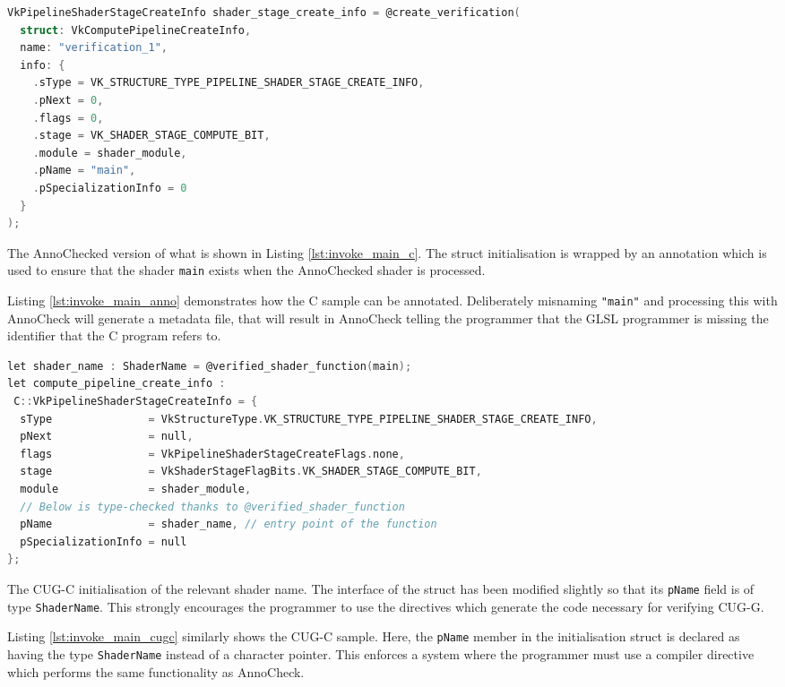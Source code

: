 \documentclass[a4paper,12pt,twoside,openright]{report}
\begin{document}
\begin{lstfloat}
\begin{lstlisting}[language=C]
VkPipelineShaderStageCreateInfo shader_stage_create_info = @create_verification(
  struct: VkComputePipelineCreateInfo,
  name: "verification_1",
  info: {
    .sType = VK_STRUCTURE_TYPE_PIPELINE_SHADER_STAGE_CREATE_INFO,
    .pNext = 0,
    .flags = 0,
    .stage = VK_SHADER_STAGE_COMPUTE_BIT,
    .module = shader_module,
    .pName = "main",
    .pSpecializationInfo = 0
  }
);
\end{lstlisting}
\caption{The AnnoChecked version of what is shown in Listing
\ref{lst:invoke_main_c}. The struct initialisation is wrapped by an annotation
which is used to ensure that the shader \texttt{main} exists when the
AnnoChecked shader is processed.}
\label{lst:invoke_main_anno}
\end{lstfloat}

Listing \ref{lst:invoke_main_anno} demonstrates how the C sample can be
annotated. Deliberately misnaming \texttt{"main"} and processing this with
AnnoCheck will generate a metadata file, that will result in AnnoCheck telling
the programmer that the GLSL programmer is missing the identifier that the C
program refers to.

\begin{lstfloat}
\begin{lstlisting}[language=C]
let shader_name : ShaderName = @verified_shader_function(main);
let compute_pipeline_create_info :
 C::VkPipelineShaderStageCreateInfo = {
  sType               = VkStructureType.VK_STRUCTURE_TYPE_PIPELINE_SHADER_STAGE_CREATE_INFO,
  pNext               = null,
  flags               = VkPipelineShaderStageCreateFlags.none,
  stage               = VkShaderStageFlagBits.VK_SHADER_STAGE_COMPUTE_BIT,
  module              = shader_module,
  // Below is type-checked thanks to @verified_shader_function
  pName               = shader_name, // entry point of the function
  pSpecializationInfo = null
};
\end{lstlisting}
\caption{The CUG-C initialisation of the relevant shader name. The interface of
the struct has been modified slightly so that its \texttt{pName} field is of
type \texttt{ShaderName}. This strongly encourages the programmer to use the
directives which generate the code necessary for verifying CUG-G.}
\label{lst:invoke_main_cugc}
\end{lstfloat}

Listing \ref{lst:invoke_main_cugc} similarly shows the CUG-C sample. Here, the
\texttt{pName} member in the initialisation struct is declared as having the
type \texttt{ShaderName} instead of a character pointer. This enforces a system
where the programmer must use a compiler directive which performs the same
functionality as AnnoCheck.
\end{document}
